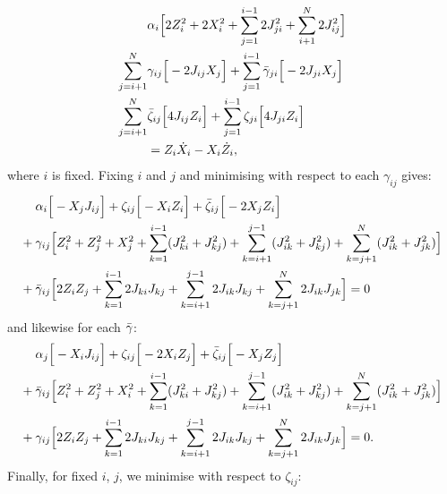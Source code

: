 \begin{equation}\label{eq:ising_graph_minimise_alpha}
    \begin{aligned}
        &\alpha_i \Big[2Z_i^2 + 2X_i^2 + \sum_{j = 1}^{i-1}2J_{ji}^2 + \sum_{i+1}^{N}2J_{ij}^2 \Big] \\
        \sum_{j = i+1}^N &\gamma_{ij} \Big[ -2J_{ij}X_j \Big] + \sum_{j = 1}^{i-1} \Bar{\gamma}_{ji} \Big[ -2J_{ji}X_j \Big] \\
        \sum_{j = i+1}^N &\Bar{\zeta}_{ij} \Big[ 4J_{ij}Z_i \Big] + \sum_{j = 1}^{i-1} \zeta_{ji} \Big[4 J_{ji}Z_i \Big] \\
        &= Z_i \dot{X}_i - X_i \dot{Z}_i,
    \end{aligned}
\end{equation}
where $i$ is fixed. Fixing $i$ and $j$ and minimising with respect to each $\gamma_{ij}$ gives:
\begin{equation}\label{eq:ising_graph_minimise_gamma}
    \begin{aligned}
        &\alpha_i\Big[ -X_j J_{ij} \Big] + \zeta_{ij}\Big[ -  X_i Z_i\Big] + \Bar{\zeta}_{ij} \Big[ -2 X_j Z_i \Big] \\
        + \: &\gamma_{ij} \Big[ Z_i^2 + Z_j^2 + X_j^2 + \sum_{k = 1}^{i-1} (J_{ki}^2 + J_{kj}^2) + \sum_{k = i+1}^{j-1} (J_{ik}^2 + J_{kj}^2) + \sum_{k = j+1}^N (J_{ik}^2 + J_{jk}^2) \Big] \\
        + \: &\Bar{\gamma}_{ij} \Big[ 2 Z_i Z_j + \sum_{k = 1}^{i-1} 2J_{ki}J_{kj} + \sum_{k = i+1}^{j-1} 2J_{ik}J_{kj} + \sum_{k = j+1}^N 2J_{ik}J_{jk} \Big] = 0
    \end{aligned}
\end{equation}
and likewise for each $\Bar{\gamma}$:
\begin{equation}\label{eq:ising_graph_minimise_gammabar}
    \begin{aligned}
        &\alpha_j\Big[ -X_i J_{ij} \Big] + \zeta_{ij}\Big[ - 2 X_i Z_j\Big] + \Bar{\zeta}_{ij} \Big[ - X_j Z_j \Big] \\
        + \: &\Bar{\gamma}_{ij} \Big[ Z_i^2 + Z_j^2 + X_i^2 + \sum_{k = 1}^{i-1} (J_{ki}^2 + J_{kj}^2) + \sum_{k = i+1}^{j-1} (J_{ik}^2 + J_{kj}^2) + \sum_{k = j+1}^N (J_{ik}^2 + J_{jk}^2) \Big] \\
        + \: &\gamma_{ij} \Big[ 2 Z_i Z_j + \sum_{k = 1}^{i-1} 2J_{ki}J_{kj} + \sum_{k = i+1}^{j-1} 2J_{ik}J_{kj} + \sum_{k = j+1}^N 2J_{ik}J_{jk} \Big] = 0.
    \end{aligned}
\end{equation}
Finally, for fixed $i$, $j$, we minimise with respect to $\zeta_{ij}$:
